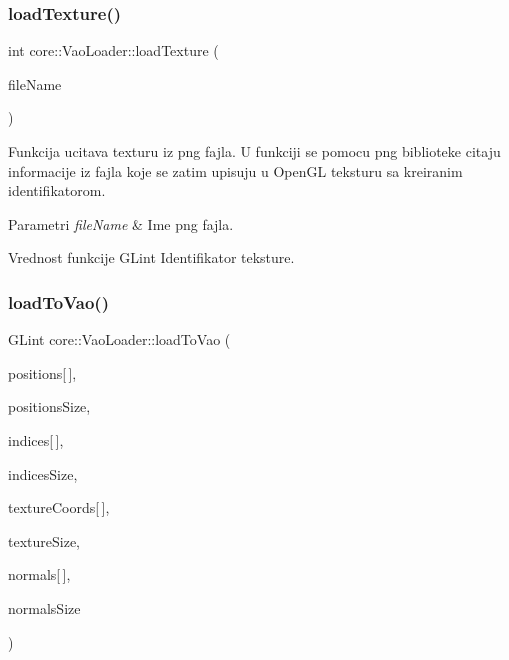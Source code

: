 \subsubsection{\texorpdfstring{load\+Texture()}{loadTexture()}}
{\footnotesize\ttfamily int core\+::\+Vao\+Loader\+::load\+Texture (\begin{DoxyParamCaption}\item[{const char $\ast$}]{file\+Name }\end{DoxyParamCaption})}



Funkcija ucitava texturu iz png fajla. U funkciji se pomocu png biblioteke citaju informacije iz fajla koje se zatim upisuju u Open\+GL teksturu sa kreiranim identifikatorom. 


\begin{DoxyParams}{Parametri}
{\em file\+Name} & Ime png fajla. \\
\hline
\end{DoxyParams}
\begin{DoxyReturn}{Vrednost funkcije}
G\+Lint Identifikator teksture. 
\end{DoxyReturn}
\mbox{\label{classcore_1_1VaoLoader_a66f6bd69acb88c9eb8ff73353d3b5312}} 
\subsubsection{\texorpdfstring{load\+To\+Vao()}{loadToVao()}\hspace{0.1cm}{\footnotesize\ttfamily [1/3]}}
{\footnotesize\ttfamily G\+Lint core\+::\+Vao\+Loader\+::load\+To\+Vao (\begin{DoxyParamCaption}\item[{G\+Lfloat}]{positions\mbox{[}$\,$\mbox{]},  }\item[{G\+Lint}]{positions\+Size,  }\item[{G\+Lint}]{indices\mbox{[}$\,$\mbox{]},  }\item[{G\+Lint}]{indices\+Size,  }\item[{G\+Lfloat}]{texture\+Coords\mbox{[}$\,$\mbox{]},  }\item[{G\+Lint}]{texture\+Size,  }\item[{G\+Lfloat}]{normals\mbox{[}$\,$\mbox{]},  }\item[{G\+Lint}]{normals\+Size }\end{DoxyParamCaption})}



